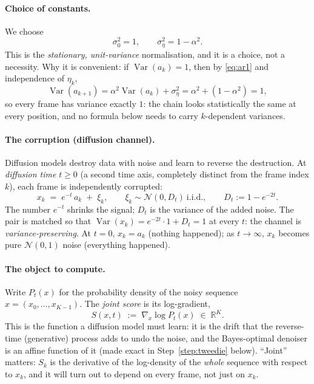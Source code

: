 \documentclass[11pt]{article}
\theoremstyle{definition}
\theoremstyle{remark}
\newcommand{\R}{\mathbb{R}}
\newcommand{\N}{\mathcal{N}}
\DeclareMathOperator{\Var}{Var}
\begin{document}
\paragraph{Choice of constants.} We choose
\begin{equation}\label{eq:stationary}
  \sigma_0^2=1,
  \qquad
  \sigma_\eta^2=1-\alpha^2 .
\end{equation}
This is the \emph{stationary, unit-variance} normalisation, and it is a
choice, not a necessity. Why it is convenient: if $\Var(a_k)=1$, then by
\eqref{eq:ar1} and independence of $\eta_k$,
\[
  \Var(a_{k+1})=\alpha^2\Var(a_k)+\sigma_\eta^2
  =\alpha^2+(1-\alpha^2)=1 ,
\]
so every frame has variance exactly $1$: the chain looks statistically the
same at every position, and no formula below needs to carry $k$-dependent
variances.

\paragraph{The corruption (diffusion channel).} Diffusion models destroy
data with noise and learn to reverse the destruction. At \emph{diffusion
time} $t\ge0$ (a second time axis, completely distinct from the frame index
$k$), each frame is independently corrupted:
\begin{equation}\label{eq:channel}
  x_k\;=\;e^{-t}\,a_k\;+\;\xi_k,
  \qquad \xi_k\sim\N(0,D_t)\ \text{i.i.d.},
  \qquad D_t:=1-e^{-2t}.
\end{equation}
The number $e^{-t}$ shrinks the signal; $D_t$ is the variance of the added
noise. The pair is matched so that
$\Var(x_k)=e^{-2t}\cdot1+D_t=1$ at every $t$: the channel is
\emph{variance-preserving}. At $t=0$, $x_k=a_k$ (nothing happened); as
$t\to\infty$, $x_k$ becomes pure $\N(0,1)$ noise (everything happened).

\paragraph{The object to compute.} Write $P_t(x)$ for the probability
density of the noisy sequence $x=(x_0,\dots,x_{K-1})$. The \emph{joint
score} is its log-gradient,
\begin{equation}\label{eq:score-def}
  S(x,t)\;:=\;\nabla_x\log P_t(x)\;\in\;\R^K .
\end{equation}
This is the function a diffusion model must learn: it is the drift that the
reverse-time (generative) process adds to undo the noise, and the
Bayes-optimal denoiser is an affine function of it (made exact in
Step~\ref{step:tweedie} below). ``Joint'' matters: $S_k$ is the derivative
of the log-density of the \emph{whole} sequence with respect to $x_k$, and
it will turn out to depend on every frame, not just on $x_k$.
\end{document}
